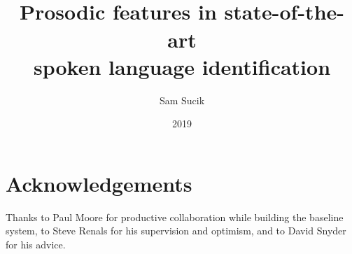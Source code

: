\documentclass[bsc,frontabs,twoside,singlespacing,parskip,deptreport]{infthesis}
\begin{document}
\title{\vspace{-5.0cm}  \vspace{1cm} \\ Prosodic features in state-of-the-art \\spoken language identification}

\author{Sam Sucik}

\project{\vspace{3cm}{\bf MInf Project (Part 1) Report}}

\date{2019}


\maketitle

\section*{Acknowledgements}{
  Thanks to Paul Moore for productive collaboration while building the baseline system, to Steve Renals for his supervision and optimism, and to David Snyder for his advice.
}

\tableofcontents

\end{document}
